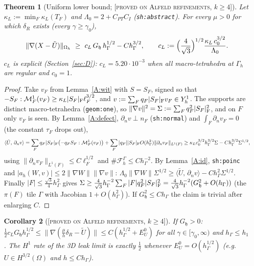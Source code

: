 \documentclass[11pt,reqno]{amsart}
\theoremstyle{plain}
\newtheorem{theorem}{Theorem}[section]
\newtheorem{corollary}[theorem]{Corollary}
\theoremstyle{definition}
\newcommand{\status}[1]{\textup{\textsc{[#1]}}}
\newcommand{\hG}{h_\Gamma}
\newcommand{\Gh}{\Gamma_h}
\newcommand{\Oh}{\Omega_h}
\newcommand{\FG}{\mathcal F_h^\Gamma}
\newcommand{\dn}{\partial_n}
\newcommand{\ip}[2]{\langle #1,\, #2\rangle}
\newcommand{\norm}[1]{\lVert #1\rVert}
\newcommand{\M}{\mathcal M}
\newcommand{\hh}{\mathfrak h}
\newcommand{\Ut}{\tilde U}
\newcommand{\Yh}{Y_h}
\begin{document}
\begin{theorem}[Uniform lower bound; \status{proved on Alfeld refinements, $k\ge4$}]\label{A:low}
Let $\kappa_L:=\min_F\kappa_L(T_F)$ and $\Lambda_0=2+C_{PT}C_I$ (\texttt{sh:abstract}). For every $\mu>0$ for which $\delta_R$ exists (every $\gamma\ge\gamma_0$),
\[
\norm{\nabla(X-\Ut)}_{\Oh}\ \ge\ c_L\,G_\hh\,\hG^{1/2}-C\hG^{3/2},\qquad c_L:=\Bigl(\frac{4}{\sqrt3}\Bigr)^{1/2}\frac{\kappa_L\,c_0^{3/2}}{\Lambda_0}.
\]
$c_L$ is explicit (Section~\ref{sec:D}): $c_L=5.20\cdot10^{-3}$ when all macro-tetrahedra at $\Gh$ are regular and $c_0=1$.
\end{theorem}
\begin{proof}
Take $v_F$ from Lemma~\ref{A:wit} with $S=S_F$, signed so that $-S_F:\M^1_F(v_F)\ge\kappa_L|S_F|_{\rm F}\ell_F^{3/2}$, and $v:=\sum_Fq_F|S_F|_{\rm F}v_F\in\Yh^1$. The supports are distinct macro-tetrahedra (\texttt{geom:one}), so $\norm{\nabla v}^2=\Sigma:=\sum_Fq_F^2|S_F|^2_{\rm F}$, and on $F$ only $v_F$ is seen. By Lemma~\ref{A:defect}, $\dn v\perp n_F$ (\texttt{sh:normal}) and $\int_F\dn v_F=0$ (the constant $\tau_F$ drops out),
\[
\ip{\Ut}{\dn v}=\sum_Fq_F|S_F|_{\rm F}\bigl(-q_FS_F:\M^1_F(v_F)\bigr)+\sum_F|q_F||S_F|_{\rm F}O(\hG^2)\norm{\dn v_F}_{L^1(F)}
\ge\kappa_Lc_0^{3/2}\hG^{3/2}\Sigma-C\hG^{3/2}\Sigma^{1/2},
\]
using $\norm{\dn v_F}_{L^1(F)}\le C\ell_F^{1/2}$ and $\#\FG\le C\hG^{-2}$. By Lemma~\ref{A:id}, \texttt{sh:poinc} and $|a_h(W,v)|\le2\norm{\nabla W}\norm{\nabla v}$: $\Lambda_0\norm{\nabla W}\Sigma^{1/2}\ge\ip\Ut{\dn v}-C\hG^2\Sigma^{1/2}$. Finally $|F|\le\frac{\sqrt3}4\hG^2$ gives $\Sigma\ge\frac4{\sqrt3}\hG^{-2}\sum_F|F|q_F^2|S_F|^2_{\rm F}=\frac4{\sqrt3}\hG^{-2}(G_\hh^2+O(\hG))$ (the $\pi(F)$ tile $\Gamma$ with Jacobian $1+O(\hG^2)$). If $G_\hh^2\le C\hG$ the claim is trivial after enlarging $C$.
\end{proof}

\begin{corollary}[\status{proved on Alfeld refinements, $k\ge4$}]\label{A:two}
If $G_\hh>0$: $\frac12c_LG_\hh\hG^{1/2}\le\norm{\nabla(\frac\mu h\delta_R-\Ut)}\le C(\hG^{1/2}+E^0_U)$ for all $\gamma\in[\gamma_0,\infty)$ and $\hG\le h_1$. The $H^1$ rate of the 3D leak limit is exactly $\frac12$ whenever $E^0_U=O(\hG^{1/2})$ (e.g.\ $U\in H^{3/2}(\Omega)$ and $h\le C\hG$).
\end{corollary}
\end{document}
